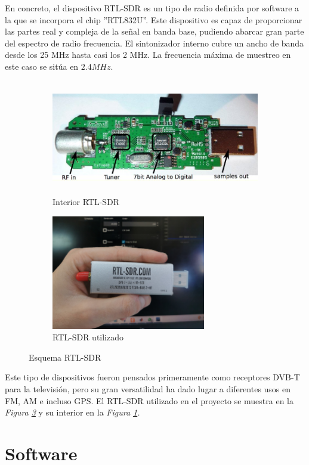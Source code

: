 \documentclass[a4paper,openright,12pt]{article}
\begin{document}
	 En concreto, el dispositivo RTL-SDR es un tipo de radio definida por software a la que se incorpora el chip ''RTL832U''. Este dispositivo es capaz de proporcionar las partes real y compleja de la señal en banda base, pudiendo abarcar gran parte del espectro de radio frecuencia. El sintonizador interno cubre un ancho de banda desde los 25 MHz hasta casi los 2 MHz. La frecuencia máxima de muestreo en este caso se sitúa en $2.4 MHz$.
	 
	 \begin{figure}[!tbp]
  \begin{subfigure}[b]{0.49\textwidth}
    \includegraphics[width=\textwidth, height=5cm]{imagenes/inner_RTL.JPG}
    \caption{Interior RTL-SDR}
    \label{inner_RTL}
  \end{subfigure}
  \hfill
  \begin{subfigure}[b]{0.49\textwidth}
    \includegraphics[width=\textwidth, height=5cm]{imagenes/rtl.JPG}
    \caption{RTL-SDR utilizado}
    \label{rtl}
  \end{subfigure}
  \caption{Esquema RTL-SDR}
\end{figure}

Este tipo de dispositivos fueron pensados primeramente como receptores DVB-T para la televisión, pero su gran versatilidad ha dado lugar a diferentes usos en FM, AM e incluso GPS.
El RTL-SDR utilizado en el proyecto se muestra en la \textit{Figura \ref{rtl}} y su interior en la \textit{Figura \ref{inner_RTL}.} 
\newpage
\section{Software}
\end{document}
